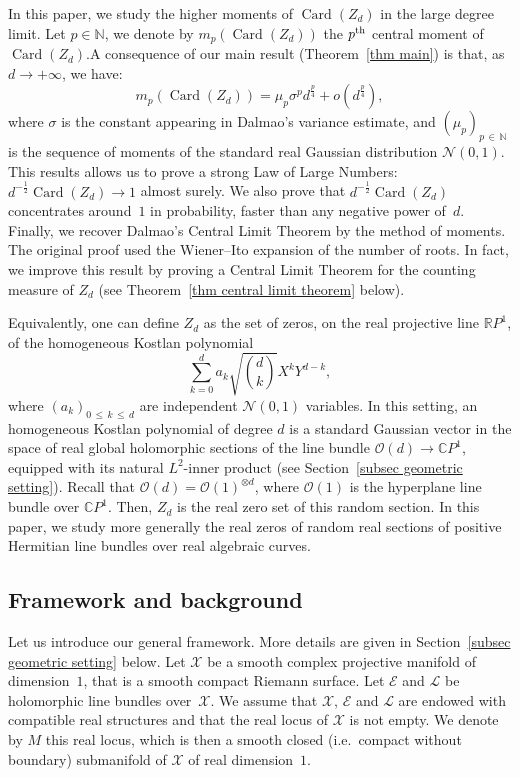 \documentclass[10pt]{amsart}
\theoremstyle{definition}\newtheorem{defi}[theo]{Definition}\newtheorem{rema}[theo]{Remark}\newtheorem{exam}[theo]{Example}\newtheorem{exem}[theo]{Example}\newtheorem{nota}[theo]{Notation}
\DeclareMathOperator{\card}{Card}
\newcommand{\E}{\mathcal{E}}
\newcommand{\X}{\mathcal{X}}
\renewcommand{\L}{\mathcal{L}}
\newcommand{\clN}{\mathcal{N}}
\newcommand{\clO}{\mathcal{O}}
\newcommand{\C}{\mathbb{C}}
\newcommand{\N}{\mathbb{N}}
\newcommand{\R}{\mathbb{R}}
\renewcommand{\leq}{\leqslant}
\begin{document}
In this paper, we study the higher moments of $\card(Z_d)$ in the large degree limit. Let $p \in \N$, we denote by $m_p(\card(Z_d))$ the $p^{\rm th}$ central moment of $\card(Z_d)$.\linebreak A consequence of our main result (Theorem~\ref{thm main}) is that, as $d \to +\infty$, we have:
\[
m_p\left(\card(Z_d)\right) = \mu_p \sigma^p d^\frac{p}{4} + o\left(d^\frac{p}{4}\right),
\]
where $\sigma$ is the constant appearing in Dalmao's variance estimate, and $(\mu_p)_{p \,\in\,\N}$ is the sequence of moments of the standard real Gaussian distribution $\clN(0,1)$. This results allows us to prove a strong Law of Large Numbers: $d^{-\frac{1}{2}}\card(Z_d) \to 1$ almost surely. We also prove that $d^{-\frac{1}{2}}\card(Z_d)$ concentrates around~$1$ in probability, faster than any negative power of~$d$. Finally, we recover Dalmao's Central Limit Theorem by the method of moments. The original proof used the Wiener--Ito expansion of the number of roots. In fact, we improve this result by proving a Central Limit Theorem for the counting measure of $Z_d$ (see Theorem~\ref{thm central limit theorem} below).

Equivalently, one can define $Z_d$ as the set of zeros, on the real projective line $\R P^1$, of the homogeneous Kostlan polynomial
\[
\sum_{k=0}^d a_k \sqrt{\binom{d}{k}} X^kY^{d-k},
\]
where $(a_k)_{0\,\leq\,k\,\leq\,d}$ are independent $\clN(0,1)$ variables. In this setting, an homogeneous Kostlan polynomial of degree $d$ is a standard Gaussian vector in the space of real global holomorphic sections of the line bundle $\clO(d) \to \C P^1$, equipped with its natural $L^2$-inner product (see Section~\ref{subsec geometric setting}). Recall that $\clO(d) = \clO(1)^{\otimes d}$, where $\clO(1)$ is the hyperplane line bundle over $\C P^1$. Then, $Z_d$ is the real zero set of this random section. In this paper, we study more generally the real zeros of random real sections of positive Hermitian line bundles over real algebraic curves.


\subsection*{Framework and background}

Let us introduce our general framework. More details are given in Section~\ref{subsec geometric setting} below. Let $\X$ be a smooth complex projective manifold of dimension~$1$, that is a smooth compact Riemann surface. Let $\E$ and $\L$ be holomorphic line bundles over~$\X$. We assume that $\X$, $\E$ and $\L$ are endowed with compatible real structures and that the real locus of $\X$ is not empty. We denote by $M$ this real locus, which is then a smooth closed (i.e.~compact without boundary) submanifold of $\X$ of real dimension~$1$.
\end{document}
